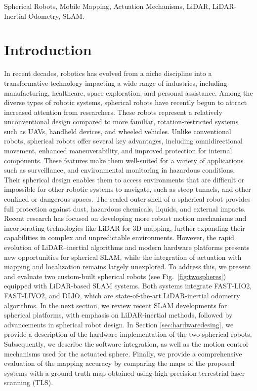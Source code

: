\documentclass[a4paper, conference]{IEEEtran}
\begin{document}
\begin{IEEEkeywords}
Spherical Robots, Mobile Mapping, Actuation Mechanisms, LiDAR, LiDAR-Inertial Odometry, SLAM.
\end{IEEEkeywords}

\section{Introduction}
In recent decades, robotics has evolved from a niche discipline into a transformative technology impacting a wide range of industries, including manufacturing, healthcare, space exploration, and personal assistance. 
Among the diverse types of robotic systems, spherical robots have recently begun to attract increased attention from researchers. These robots represent a relatively unconventional design compared to more familiar, rotation-restricted systems such as UAVs, handheld devices, and wheeled vehicles. 
Unlike conventional robots, spherical robots offer several key advantages, including omnidirectional movement, enhanced maneuverability, and improved protection for internal components. 
These features make them well-suited for a variety of applications such as surveillance, and environmental monitoring in hazardous conditions. 
Their spherical design enables them to access environments that are difficult or impossible for other robotic systems to navigate, such as steep tunnels, and other confined or dangerous spaces.
The sealed outer shell of a spherical robot provides full protection against dust, hazardous chemicals, liquids, and external impacts. 
Recent research has focused on developing more robust motion mechanisms \cite{roboball,novelsphere,pendulum_sphere} and incorporating technologies like LiDAR for 3D mapping, further expanding their capabilities in complex and unpredictable environments\cite{Kalman_filter_sphere,DAEDALUS,sphere_Fabi_1}.
However, the rapid evolution of LiDAR–inertial algorithms and modern hardware platforms presents new opportunities for spherical SLAM, while the integration of actuation with mapping and localization remains largely unexplored.
To address this, we present and evaluate two custom-built spherical robots (see Fig.~\ref{fig:twospheres}) equipped with LiDAR-based SLAM systems.
Both systems integrate FAST-LIO2\cite{fastlio2}, FAST-LIVO2\cite{fastlivo2}, and DLIO\cite{dlio}, which are state-of-the-art LiDAR-inertial odometry algorithms.
In the next section, we review recent SLAM developments for spherical platforms, with emphasis on LiDAR-inertial methods, followed by advancements in spherical robot design.
In Section \ref{sec:hardwaredesing}, we provide a description of the hardware implementation of the two spherical robots. 
Subsequently, we describe the software integration, as well as the motion control mechanisms used for the actuated sphere. 
Finally, we provide a comprehensive evaluation of the mapping accuracy by comparing the maps of the proposed systems with a ground truth map obtained using high-precision terrestrial laser scanning (TLS). 
\end{document}

